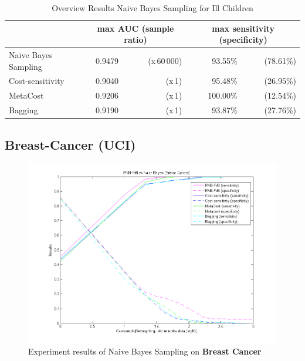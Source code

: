 \begin{table}[h]
\centering  
\begin{tabular}{ l | c r | r r|}                                      
& \multicolumn{2}{c}{max AUC (sample ratio)} & \multicolumn{2}{c}{max sensitivity (specificity)} \\
\hline 
Naive Bayes Sampling & 0.9479 & (x\,60\,000) & 93.55\% & (78.61\%)\\
Cost-sensitivity & 0.9040 & (x\,1) & 95.48\% & (26.95\%)\\
MetaCost & 0.9206 & (x\,1) & 100.00\% & (12.54\%)\\
Bagging & 0.9190 & (x\,1) & 93.87\% & (27.76\%)\\
\hline                          %
\end{tabular}
\label{tab:PPer}
\caption{Overview Results Naive Bayes Sampling for Ill Children} %
\end{table}
 

\newpage
\subsection{Breast-Cancer (UCI)}
\begin{figure}[h]
\includegraphics[scale=0.65]{img/RNB-FvB-breastcancer.png}
\caption{Experiment results of Naive Bayes Sampling on \textbf{Breast Cancer}}
\end{figure}

